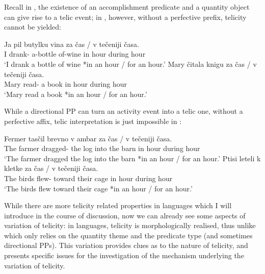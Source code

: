 \documentclass[output=paper]{langsci/langscibook}
\begin{document}
Recall in , the existence of an accomplishment predicate and a quantity
object can give rise to a telic event; in , however, without a
perfective prefix, telicity cannot be yielded:

\begin{exe}
    \ex {} \parencite[146]{MacDonald2008} \begin{xlist}
    \ex \gll Ja pil butylku vina \llap{*}za čas / {v tečeniji} časa.\\
	        I {drank-\Ipfv} a-bottle of-wine in hour {} during hour \\
	    \glt \enquote*{I drank a bottle of wine *in an hour / for an hour.}
    \ex \gll  Mary čitala knigu \llap{*}za čas / {v tečeniji} časa.\\
            Mary {read-\Ipfv} {a book} in hour {} during hour\\
        \glt \enquote*{Mary read a book *in an hour / for an hour.}
\end{xlist}
\end{exe}

While a directional PP can turn an activity event into a telic one, without a
perfective affix, telic interpretation is just impossible in :

\begin{exe}
\ex {} \parencite[148]{MacDonald2008} \begin{xlist}
	\ex \gll Fermer tasčil brevno v ambar \llap{*}za čas / {v tečeniji} časa.\\
	        {The farmer} {dragged-\Ipfv} {the log} into {the barn} in hour {} during hour \\
	    \glt \enquote*{The farmer dragged the log into the barn *in an hour / for an hour.}
    \ex \gll  Ptisi leteli k kletke \llap{*}za čas / {v tečeniji} časa.\\
            {The birds} {flew-\Ipfv} toward {their cage} in hour {} during hour\\
        \glt \enquote*{The birds flew toward their cage *in an hour / for an hour.}
\end{xlist}
\end{exe}

While there are more telicity related properties in  languages which I
will introduce in the course of discussion, now we can already see some aspects
of variation of telicity: in  languages, telicity is morphologically
realised, thus unlike  which only relies on the quantity theme and the
predicate type (and sometimes directional PPs). This variation provides clues
as to the nature of telicity, and presents specific issues for the
investigation of the mechanism underlying the variation of telicity.
\end{document}
